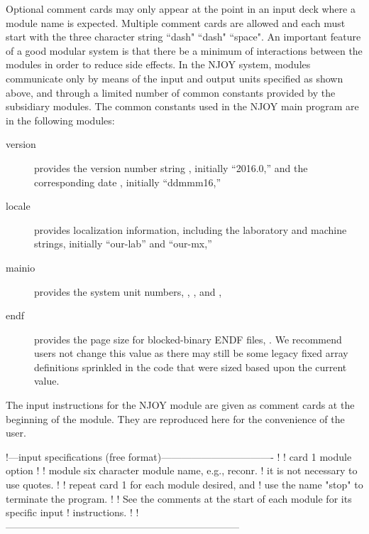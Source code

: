 Optional comment cards may only appear at the point in an input deck
where a module name is expected.  Multiple comment cards are allowed
and each must start with the three character string ``dash" ``dash" ``space".
An important feature of a good modular system is that there be a
minimum of interactions between the modules in order to reduce
side effects.  In the NJOY system, modules communicate only
by means of the input and output units specified as shown above,
and through a limited number of common constants provided by
the subsidiary modules.  The common constants used in the NJOY
main program are in the following modules:
\begin{singlespace}
\begin{description}
\item[version] provides the version number string ,
  initially ``2016.0,'' and the corresponding date ,
  initially ``ddmmm16,''
\item[locale] provides localization information, including the
  laboratory and machine strings, initially ``our-lab'' and
  ``our-mx,''
\item[mainio] provides the system unit numbers, ,
  , and ,
\item[endf] provides the page size for blocked-binary ENDF files,
  .  We recommend users not change this value as there
  may still be some legacy fixed array definitions sprinkled in
  the code that were sized based upon the current value.
\end{description}
\end{singlespace}

\noindent
The input instructions for the NJOY module are given as comment cards
at the beginning of the module.  They are reproduced here for the
convenience of the user.

\small
\begin{ccode}

!---input specifications (free format)----------------------------------
!
! card 1       module option
!
!    module    six character module name, e.g., reconr.
!              it is not necessary to use quotes.
!
!          repeat card 1 for each module desired, and
!          use the name "stop" to terminate the program.
!
! See the comments at the start of each module for its specific input
! instructions.
!
!-----------------------------------------------------------------------

\end{ccode}
\normalsize

